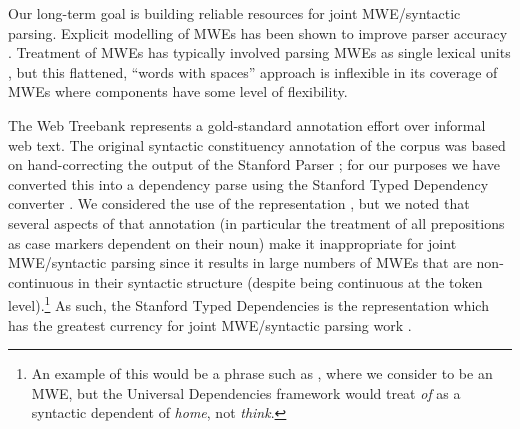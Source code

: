 \documentclass[output=paper,modfonts,nonflat]{langsci/langscibook}
\begin{document}
Our long-term goal is building reliable resources for joint MWE/syntactic parsing. Explicit modelling of MWEs has been shown to improve parser accuracy \citep{nivre04acl,Seretan:Wehrli:2006,Finkeletal09,Korkontzelos:2010:RME:1857999.1858088,Green:2013:PMI:2464100.2464109,hulvc,Wehrli:2010,candito-constant:acl:2014,constant-nivre:acl:2016}. Treatment of MWEs has typically involved parsing MWEs as single lexical units \citep{nivre04acl,Eryigit:2011:MES:2206359.2206365,Fotopoulou14}, but this flattened, ``words with spaces'' \citep{Sag2002a} approach is inflexible in its coverage of MWEs where components have some level of flexibility.

The  Web Treebank \citep{EWT} represents a gold-standard annotation effort over informal web text. The original syntactic constituency annotation of the corpus was based on hand-correcting the output of the Stanford Parser \citep{Manning+:2014}; for our purposes we have converted this into a dependency parse using the Stanford Typed Dependency converter \citep{StanfordDep}. We considered the use of the  representation \citep{univdep}, but we noted that several aspects of that annotation (in particular the treatment of all prepositions as case markers dependent on their noun) make it inappropriate for joint MWE/syntactic parsing since it results in large numbers of MWEs that are non-continuous in their syntactic structure (despite being continuous at the token level).\footnote{An example of this would be a phrase such as , where we consider  to be an MWE, but the Universal Dependencies framework would treat \textit{of} as a syntactic dependent of \textit{home}, not \textit{think}.} As such, the Stanford Typed Dependencies is the representation which has the greatest currency for joint MWE/syntactic parsing work \citep{constant-nivre:acl:2016}. 
\end{document}
